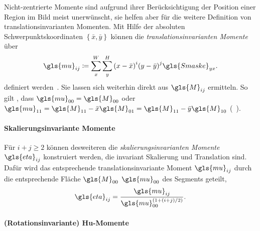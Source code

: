 Nicht-zentrierte Momente sind aufgrund ihrer Berücksichtigung der Position einer Region im Bild meist unerwünscht, sie helfen aber für die weitere Definition von translationsinvarianten Momenten.
Mit Hilfe der absoluten Schwerpunktskoordinaten $\left\{ \bar{x}, \bar{y} \right\}$ können die \emph{translationsinvarianten Momente} über
\begin{equation*}
  \gls{mu}_{ij} \coloneqq \sum_x^W \sum_y^H {\left(x - \bar{x}\right)}^i {\left(y - \bar{y}\right)}^j \gls{Smaske}_{yx}.
\end{equation*}
definiert werden~\cite{momente}.
Sie lassen sich weiterhin direkt aus $\gls{M}_{ij}$ ermitteln.
So gilt \zB{}, dass $\gls{mu}_{00} = \gls{M}_{00}$ oder $\gls{mu}_{11} = \gls{M}_{11} - \bar{x}\gls{M}_{01} = \gls{M}_{11} - \bar{y}\gls{M}_{10}$ (\vgl{}~\cite{momente}).

\paragraph{Skalierungsinvariante Momente}
\label{skalierungsinvariante_zentrierte_momente}

Für $i+j \geq 2$ können desweiteren die \emph{skalierungsinvarianten Momente} $\gls{eta}_{ij}$ konstruiert werden, die invariant \bzgl{} Skalierung und Translation sind.
Dafür wird das entsprechende translationsinvariante Moment $\gls{mu}_{ij}$ durch die entsprechende Fläche $\gls{M}_{00}$ \bzw{} $\gls{mu}_{00}$ des Segments geteilt, \dhe{}~\cite{momente}
\begin{equation*}
  \gls{eta}_{ij} = \frac{\gls{mu}_{ij}}{\gls{mu}_{00}^{\left(1+\left(i+j\right)/2\right)}}.
\end{equation*}

\paragraph{(Rotationsinvariante) Hu-Momente}
\label{rotationsinvariante_momente}

